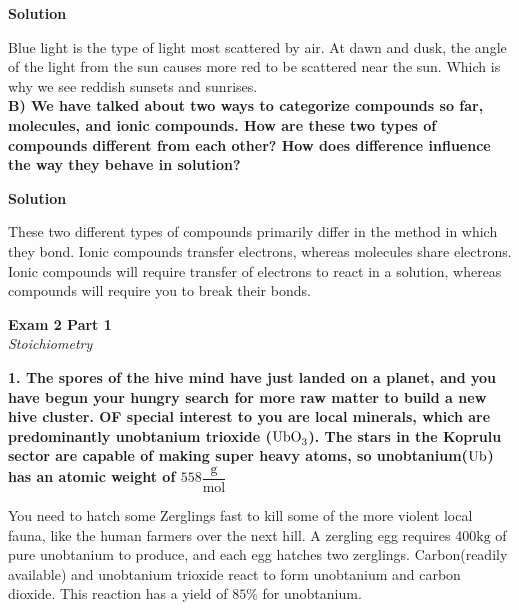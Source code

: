\documentclass{article}
\begin{document}
    \textbf{Solution}

    Blue light is the type of light most scattered by air. At dawn and dusk, the angle of the light from the sun causes more red to be scattered near the sun. Which is why we see reddish sunsets and sunrises.\\[1cm]

    \textbf{B) We have talked about two ways to categorize compounds so far, molecules, and ionic compounds. How are these two types of compounds different from each other? How does difference influence the way they behave in solution?}

    \textbf{Solution}

    These two different types of compounds primarily differ in the method in which they bond. Ionic compounds transfer electrons, whereas molecules share electrons. Ionic compounds will require transfer of electrons to react in a solution, whereas compounds will require you to break their bonds.

    \pagebreak


    \begin{center}
        \textbf{Exam 2 Part 1}\\
        \textit{Stoichiometry}
    \end{center}
    \textbf{1. The spores of the hive mind have just landed on a planet, and you have begun your hungry search for more raw matter to build a new hive cluster. OF special interest to you are local minerals, which are predominantly unobtanium trioxide ($\ce{UbO_{3}}$). The stars in the Koprulu sector are capable of making super heavy atoms, so unobtanium($\ce{Ub}$) has an atomic weight of $558 \dfrac{\si{\gram}}{\si{\mol}}$}

    You need to hatch some Zerglings fast to kill some of the more violent local fauna, like the human farmers over the next hill. A zergling egg requires $400 \si{\kilo\gram}$ of pure unobtanium to produce, and each egg hatches two zerglings. Carbon(readily available) and unobtanium trioxide react to form unobtanium and carbon dioxide. This reaction has a yield of $85\%$ for unobtanium.
\end{document}
